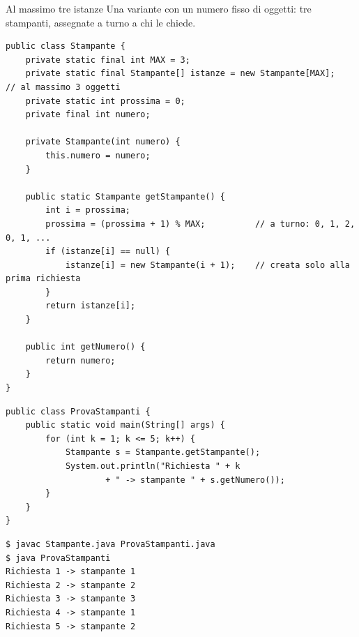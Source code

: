 \begin{esempio}{Al massimo tre istanze}
Una variante con un numero fisso di oggetti: tre stampanti, assegnate a turno a chi le chiede.

\begin{lstlisting}[style=java, name=Stampante.java]
public class Stampante {
    private static final int MAX = 3;
    private static final Stampante[] istanze = new Stampante[MAX];   // al massimo 3 oggetti
    private static int prossima = 0;
    private final int numero;

    private Stampante(int numero) {
        this.numero = numero;
    }

    public static Stampante getStampante() {
        int i = prossima;
        prossima = (prossima + 1) % MAX;          // a turno: 0, 1, 2, 0, 1, ...
        if (istanze[i] == null) {
            istanze[i] = new Stampante(i + 1);    // creata solo alla prima richiesta
        }
        return istanze[i];
    }

    public int getNumero() {
        return numero;
    }
}
\end{lstlisting}
\noindent\begin{minipage}[t]{0.55\textwidth}
\begin{lstlisting}[style=java, name=ProvaStampanti.java]
public class ProvaStampanti {
    public static void main(String[] args) {
        for (int k = 1; k <= 5; k++) {
            Stampante s = Stampante.getStampante();
            System.out.println("Richiesta " + k
                    + " -> stampante " + s.getNumero());
        }
    }
}
\end{lstlisting}
\end{minipage}\hfill
\begin{minipage}[t]{0.42\textwidth}
\begin{lstlisting}[style=shell, name=Terminale]
$ javac Stampante.java ProvaStampanti.java
$ java ProvaStampanti
Richiesta 1 -> stampante 1
Richiesta 2 -> stampante 2
Richiesta 3 -> stampante 3
Richiesta 4 -> stampante 1
Richiesta 5 -> stampante 2
\end{lstlisting}
\end{minipage}
\end{esempio}

